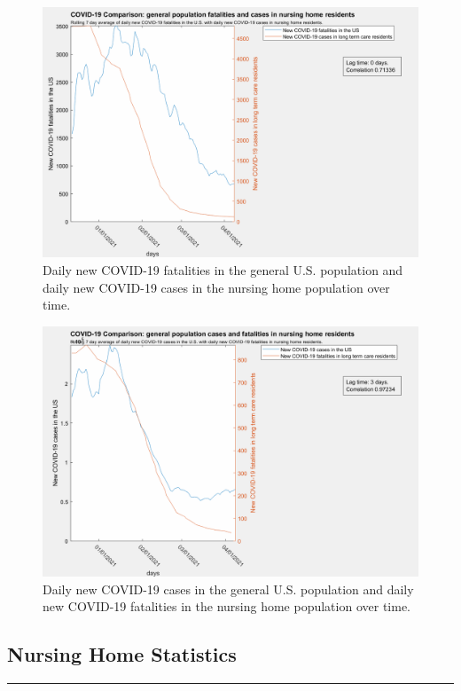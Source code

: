 \documentclass[twoside]{article}
\begin{document}
\begin{multicols}{2}
\begin{figure}[H]
	\includegraphics[width=\linewidth]{images/usaFatalities_nursingCases-0lag.png}
	\caption{Daily new COVID-19 fatalities in the general U.S. population and daily new COVID-19 cases in the nursing home population over time.}
	\label{fig:images/usaFatalities_nursingCases-0lagLabel}
\end{figure}

\begin{figure}[H]
	\includegraphics[width=\linewidth]{images/usaCases_nursingFatalities-3lag.png}
	\caption{Daily new COVID-19 cases in the general U.S. population and daily new COVID-19 fatalities in the nursing home population over time.}
	\label{fig:images/usaCases_nursingFatalities-3lagLabel}
\end{figure}

\subsection{Nursing Home Statistics}
\rule{\linewidth}{0.25pt}


\end{multicols}
\end{document}
